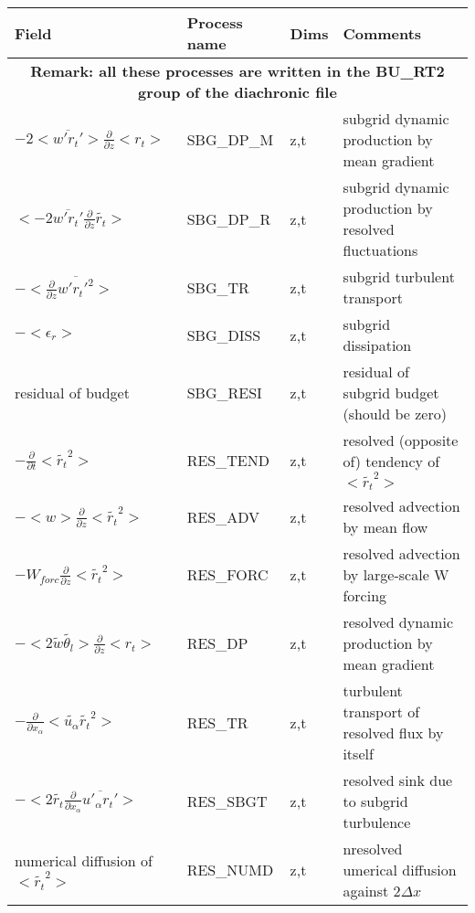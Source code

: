 \begingroup
\renewcommand\arraystretch{1.5}
\begin{longtable}[c]{|p{}|p{}|p{}|p{}|}
\hline
Field & Process name & Dims & Comments \\
\hline \hline
\endhead
\multicolumn{4}{|c|}{\textbf{Remark: all these processes are written in the BU\_RT2 group of the diachronic file}} \\
\hline
\endfoot
$- 2 <\overline{w'r_t'}>\frac{\partial }{\partial z}<r_t>$             & SBG\_DP\_M & z,t & subgrid dynamic production by mean gradient \\\hline
$<-2 \overline{w'r_t'}\frac{\partial}{\partial z}\tilde{r_t}>$         & SBG\_DP\_R & z,t & subgrid dynamic production by resolved fluctuations\\\hline
$-<\frac{\partial}{\partial z}\overline{w'r_t'^2}>$                    & SBG\_TR    & z,t & subgrid turbulent transport\\\hline
$-<\epsilon_r>$                                                        & SBG\_DISS  & z,t & subgrid dissipation \\\hline
{\rm residual of budget}                                               & SBG\_RESI  & z,t & residual of subgrid budget (should be zero) \\\hline
$-\frac{\partial }{\partial t}<\tilde{r_t}^2>$                         & RES\_TEND  & z,t & resolved (opposite of) tendency of $<\tilde{r_t}^2>$\\\hline
$-<w>\frac{\partial}{\partial z}<\tilde{r_t}^2>$                       & RES\_ADV   & z,t & resolved advection by mean flow\\\hline
$-W_{forc}\frac{\partial}{\partial z}<\tilde{r_t}^2>$                  & RES\_FORC  & z,t & resolved advection by large-scale W forcing\\\hline
$-< 2 \tilde{w}\tilde{\theta_l}>\frac{\partial }{\partial z}<r_t>$     & RES\_DP    & z,t & resolved dynamic production by mean gradient \\\hline
$-\frac{\partial}{\partial x_\alpha} <\tilde{u_\alpha} \tilde{r_t}^2>$ & RES\_TR    & z,t & turbulent transport of resolved flux by itself \\\hline
$- <2 \tilde{r_t}\frac{\partial}{\partial x_\alpha}\overline{u'_\alpha r_t'}>$ & RES\_SBGT & z,t & resolved sink due to subgrid turbulence \\\hline
{\rm numerical diffusion of } $<\tilde{r_t}^2>$                        & RES\_NUMD  & z,t & nresolved umerical diffusion against $2\Delta x$ \\\hline

\end{longtable}
